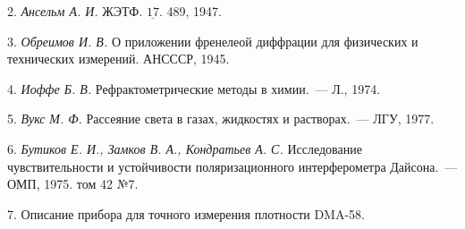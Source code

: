 2. {\itshape Ансельм А. И.} ЖЭТФ. $\underline{17}$. 489, 1947.

3. {\itshape Обреимов И. В.} О приложении френелеой диффрации для физических и технических измерений. АНСССР, 1945.

4. {\itshape Иоффе Б. В.} Рефрактометрические методы в химии.~--- Л., 1974.

5. {\itshape Вукс М. Ф.} Рассеяние света в газах, жидкостях и растворах.~--- ЛГУ, 1977.

6. {\itshape Бутиков Е. И., Замков В. А., Кондратьев А. С.} Исследование чувствительности и устойчивости
поляризационного интерферометра Дайсона.~--- ОМП, 1975. том 42 №7.

7. Описание прибора для точного измерения плотности DMA-58.\thispagestyle{empty}


